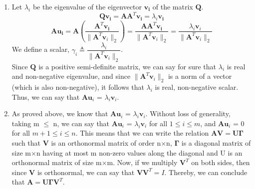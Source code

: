 \documentclass{article}
\begin{document}
\begin{enumerate}
\begin{enumerate}
\begin{enumerate}
            \item Let $\lambda_i$ be the eigenvalue of the eigenvector $\boldsymbol{v_i}$ of the matrix $\boldsymbol{Q}$.
            \[
                \boldsymbol{Q} \boldsymbol{v_i} = \boldsymbol{AA}^T \boldsymbol{v_i} = \lambda_i \boldsymbol{v_i}
            \]
            \[
                \boldsymbol{A} \boldsymbol{u_i} = \boldsymbol{A} \left( \frac{\boldsymbol{A}^T\boldsymbol{v_i}}{\|\boldsymbol{A}^T \boldsymbol{v}_i\|_2}\right) = \frac{\boldsymbol{A} \boldsymbol{A}^T \boldsymbol{v_i}}{\|\boldsymbol{A}^T \boldsymbol{v}_i\|_2} = \frac{\lambda_i \boldsymbol{v}_i }{\|\boldsymbol{A}^T \boldsymbol{v}_i\|_2}
            \]
            We define a scalar, $\gamma_i \triangleq \dfrac{\lambda_i}{\|\boldsymbol{A}^T \boldsymbol{v}_i\|_2}$. \\
            Since $\boldsymbol{Q}$ is a positive semi-definite matrix, we can say for sure that $\lambda_i$ is real and non-negative eigenvalue, and since $\|\boldsymbol{A}^T \boldsymbol{v}_i\|_2$ is a norm of a vector (which is also non-negative), it follows that $\lambda_i$ is real, non-negative scalar. \\
            Thus, we can say that $\boldsymbol{A}\boldsymbol{u}_i$ = $\lambda_i \boldsymbol{v}_i$.

            
            \item As proved above, we know that $\boldsymbol{A}\boldsymbol{u}_i$ = $\lambda_i \boldsymbol{v}_i$. Without loss of generality, taking m $\leq$ n, we can say that $\boldsymbol{A}\boldsymbol{u}_i$ = $\lambda_i \boldsymbol{v}_i$ for all $1 \leq i \leq m$, and $\boldsymbol{A}\boldsymbol{u}_i$ = 0 for all $m+1 \leq i \leq n$. This means that we can write the relation $\boldsymbol{AV = U\Gamma}$ such that $\boldsymbol{V}$ is an orthonormal matrix of order n$\times$n, $\boldsymbol{\Gamma}$ is a diagonal matrix of size m$\times$n having at most m non-zero values along the diagonal and U is an orthonormal matrix of size m$\times$m. Now, if we multiply $\boldsymbol{V}^T$ on both sides, then since $\boldsymbol{V}$ is orthonormal, we can say that $\boldsymbol{V}\boldsymbol{V}^T = I$. Thereby, we can conclude that $\boldsymbol{A} = \boldsymbol{U} \boldsymbol{\Gamma} \boldsymbol{V}^T$.
        \end{enumerate}
    \end{enumerate}
    
\end{enumerate}
\end{document}
